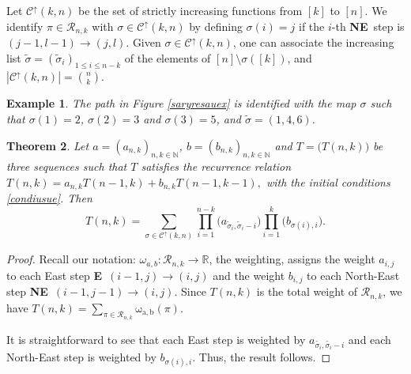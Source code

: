 \documentclass[12pt,a4paper]{article}
\newtheorem{theorem}{Theorem}[section]
\newtheorem{example}[theorem]{Example}%
\theoremstyle{definition} %
\theoremstyle{remark}
\theoremstyle{examples}
\newenvironment{porofo}[1][Proof]{%
	\begin{proof}[#1]%
	}{%
	\end{proof}%
}
\newcommand{\cheg}{\mathcal{R}_{n,k}}
\newcommand{\suit}[1]{{#1}(n,k)}
\newcommand{\coul}[1]{#1_{n,k}}
\newcommand{\cou}[3]{#1_{#2,#3}}
\newcommand{\poi}[1]{#1_{i,j}}
\newcommand{\es}{\textbf{E}}
\newcommand{\nes}{\textbf{NE}}
\newcommand{\natu}{\mathbb{N}}
\newcommand{\poiw}[1]{\mathrm{#1}}
\newcommand{\nkid}{}
\begin{document}
		Let $\mathcal{C}^\uparrow(k,n)$ be the set of strictly increasing functions from $[k]$ to $[n]$.
	We identify $\pi \in \cheg$ with $\sigma \in \mathcal{C}^\uparrow(k,n)$ by defining $\sigma(i)=j$ if the $i$-th \nes\ step is $(j-1,l-1)\to (j,l)$. 
	Given $\sigma \in \mathcal{C}^\uparrow(k,n)$, one can associate the increasing list $\tilde{\sigma}=(\tilde{\sigma}_i)_{1\leq i\leq n-k}$ of the elements of $[n]\setminus \sigma([k])$, and $|\mathcal{C}^\uparrow(k,n)|={n\choose k}$.
	\begin{example}\rm The path in Figure \ref{saryresauex} is identified with the map $\sigma$ such that $\sigma(1)=2$, $\sigma(2)=3$ and $\sigma(3)=5$, and $\tilde{\sigma}=(1,4,6)$.  
	\end{example}
	\begin{theorem}\label{princitheo}
		Let $a=(a_{n,k})_{n,k\in \natu}$, $b=(b_{n,k})_{n,k\in \natu}$ and $T=\big(\suit{T}\big)\nkid$ be three sequences such that $T$ satisfies the recurrence relation
	$\displaystyle	\suit{T}=\coul{a}T(n-1,k)+\coul{b}T(n-1,k-1),$
		with the initial conditions \eqref{condiusue}. Then
		\begin{equation}\label{pprinceq}
		\suit{T}
		=\sum_{\sigma \in \mathcal{C}^\uparrow(k,n)}
		\prod_{i=1}^{n-k} \big( \cou{a}{\tilde{\sigma}_i}{\tilde{\sigma}_i-i} \big)
		\prod_{i=1}^{k} \big( \cou{b}{\sigma(i)}{i} \big).
		\end{equation}
	\end{theorem}
	
	\begin{porofo}
		Recall our notation: $\omega_{a,b} : \cheg \to \mathbb{R}$, the weighting, assigns
		the weight $\poi{a}$ to each East step \es\ $(i-1,j) \to (i,j)$ and the weight
		$\poi{b}$ to each North-East step \nes\ $(i-1,j-1) \to (i,j)$. Since $\suit{T}$
		is the total weight of $\cheg$, we have
		$\displaystyle
		\suit{T} = \sum_{\pi \in \cheg} \poiw{\omega_{a,b}}(\pi).
		$
		
		It is straightforward to see that each East step is weighted by $a_{\tilde{\sigma_i},\tilde{\sigma_i}-i}$ and each North-East step is weighted by $b_{\sigma(i),i}$. Thus, the result follows.
	\end{porofo}
\end{document}
